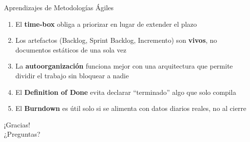 \documentclass[11pt,aspectratio=169]{beamer}
\begin{document}
\begin{frame}{Aprendizajes de Metodologías Ágiles}
  \begin{enumerate}
    \item El \textbf{time-box} obliga a priorizar en lugar de extender el plazo
    \item Los artefactos (Backlog, Sprint Backlog, Incremento) son \textbf{vivos}, no documentos estáticos de una sola vez
    \item La \textbf{autoorganización} funciona mejor con una arquitectura que permite dividir el
          trabajo sin bloquear a nadie
    \item El \textbf{Definition of Done} evita declarar ``terminado'' algo que solo compila
    \item El \textbf{Burndown} es útil solo si se alimenta con datos diarios reales, no al cierre
  \end{enumerate}
\end{frame}

\begin{frame}[standout]
  ¡Gracias!\\
  \small ¿Preguntas?
\end{frame}
\end{document}
